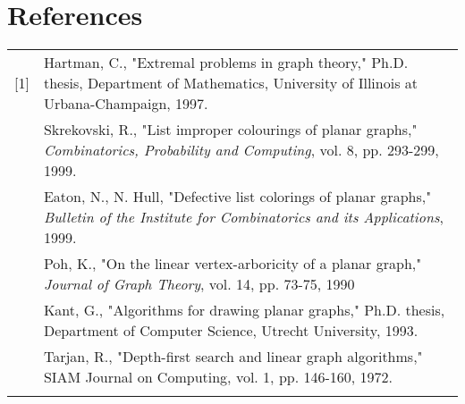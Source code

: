 \documentclass[12pt,a4paper]{article}
\begin{document}
\begin{comment}
\noindent We set $P$ to be the single vertex path $x$ and use continue\_path$(P)$ to find the desired path.
Then we color $P$, setting $\lambda(v)=c$ for all $v\in P$.\\

\section{Algorithm}

Let $P=c_0c_1\ldots c_i$ be the path clockwise along the outer face connecting $x=c_0$ and $y=c_i$.
Let $N(v)[u,v]$ denote the list of neighbors of $v$ from $u$ to $v$, inclusive, in clockwise embedded order. We
denote $N(v)(u,v)$ 
\end{comment}

\section*{References}

\begin{tabularx}{\linewidth}{lX}
[1] & Hartman, C., "Extremal problems in graph theory," Ph.D. thesis, Department of Mathematics,
University of Illinois at Urbana-Champaign, 1997.\\\relax
[2] & Skrekovski, R., "List improper colourings of planar graphs,"
\emph{Combinatorics, Probability and Computing}, vol. 8, pp. 293-299, 1999.\\\relax
[3] & Eaton, N., N. Hull, "Defective list colorings of planar graphs,"
\emph{Bulletin of the Institute for Combinatorics and its Applications}, 1999.\\\relax
[4] & Poh, K., "On the linear vertex-arboricity of a planar graph," \emph{Journal of Graph Theory},
vol. 14, pp. 73-75, 1990\\\relax
[5] & Kant, G., "Algorithms for drawing planar graphs," Ph.D. thesis, Department of Computer Science,
Utrecht University, 1993.\\\relax
[6] & Tarjan, R., "Depth-first search and linear graph algorithms," SIAM Journal on Computing, vol. 1, pp.
146-160, 1972.\\\relax
\end{tabularx}
\end{document}
